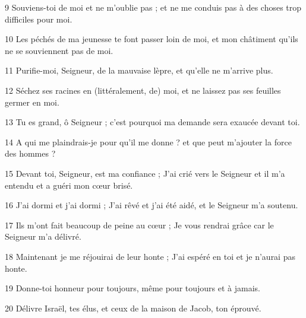 \par 9 Souviens-toi de moi et ne m'oublie pas ; et ne me conduis pas à des choses trop difficiles pour moi.

\par 10 Les péchés de ma jeunesse te font passer loin de moi, et mon châtiment qu'ils ne se souviennent pas de moi.

\par 11 Purifie-moi, Seigneur, de la mauvaise lèpre, et qu'elle ne m'arrive plus.

\par 12 Séchez ses racines en (littéralement, de) moi, et ne laissez pas ses feuilles germer en moi.

\par 13 Tu es grand, ô Seigneur ; c'est pourquoi ma demande sera exaucée devant toi.

\par 14 A qui me plaindrais-je pour qu'il me donne ? et que peut m'ajouter la force des hommes ?

\par 15 Devant toi, Seigneur, est ma confiance ; J'ai crié vers le Seigneur et il m'a entendu et a guéri mon cœur brisé.

\par 16 J'ai dormi et j'ai dormi ; J'ai rêvé et j'ai été aidé, et le Seigneur m'a soutenu.

\par 17 Ils m'ont fait beaucoup de peine au cœur ; Je vous rendrai grâce car le Seigneur m'a délivré.

\par 18 Maintenant je me réjouirai de leur honte ; J'ai espéré en toi et je n'aurai pas honte.

\par 19 Donne-toi honneur pour toujours, même pour toujours et à jamais.

\par 20 Délivre Israël, tes élus, et ceux de la maison de Jacob, ton éprouvé.

